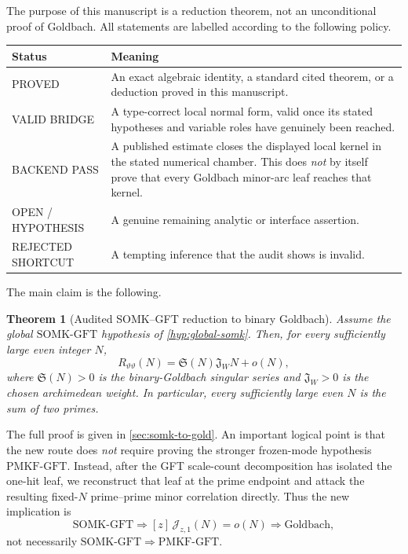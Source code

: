 \documentclass[11pt]{article}
\newtheorem{theorem}{Theorem}[section]
\theoremstyle{definition}
\theoremstyle{remark}
\newcommand{\1}{\mathbf 1}
\newcommand{\SG}{\mathfrak S}
\newcommand{\Jw}{\mathfrak J_W}
\newcommand{\PMKF}{\mathrm{PMKF}\text{-}\mathrm{GFT}}
\newcommand{\SOMK}{\mathrm{SOMK}\text{-}\mathrm{GFT}}
\begin{document}
The purpose of this manuscript is a reduction theorem, not an unconditional proof of Goldbach.  All statements are labelled according to the following policy.

\begin{center}
\begin{tabular}{>{\raggedright\arraybackslash}p{} >{\raggedright\arraybackslash}p{}}
\toprule
\textbf{Status} & \textbf{Meaning}\\
\midrule
PROVED & An exact algebraic identity, a standard cited theorem, or a deduction proved in this manuscript.\\
VALID BRIDGE & A type-correct local normal form, valid once its stated hypotheses and variable roles have genuinely been reached.\\
BACKEND PASS & A published estimate closes the displayed local kernel in the stated numerical chamber.  This does \emph{not} by itself prove that every Goldbach minor-arc leaf reaches that kernel.\\
OPEN / HYPOTHESIS & A genuine remaining analytic or interface assertion.\\
REJECTED SHORTCUT & A tempting inference that the audit shows is invalid.\\
\bottomrule
\end{tabular}
\end{center}

The main claim is the following.

\begin{theorem}[Audited SOMK--GFT reduction to binary Goldbach]\label{thm:main}
Assume the global \(\SOMK\) hypothesis of \cref{hyp:global-somk}.  Then, for every sufficiently large even integer \(N\),
\begin{equation}\label{eq:main-asymp}
 R_{\vartheta\vartheta}(N)
 =\SG(N)\Jw N+o(N),
\end{equation}
where \(\SG(N)>0\) is the binary-Goldbach singular series and \(\Jw>0\) is the chosen archimedean weight.  In particular, every sufficiently large even \(N\) is the sum of two primes.
\end{theorem}

The full proof is given in \cref{sec:somk-to-gold}.  An important logical point is that the new route does \emph{not} require proving the stronger frozen-mode hypothesis \(\PMKF\).  Instead, after the GFT scale-count decomposition has isolated the one-hit leaf, we reconstruct that leaf at the prime endpoint and attack the resulting fixed-\(N\) prime--prime minor correlation directly.  Thus the new implication is
\[
 \SOMK
 \Longrightarrow [z]\,\mathcal J_{z,1}(N)=o(N)
 \Longrightarrow \text{Goldbach},
\]
not necessarily \(\SOMK\Rightarrow\PMKF\).
\end{document}
